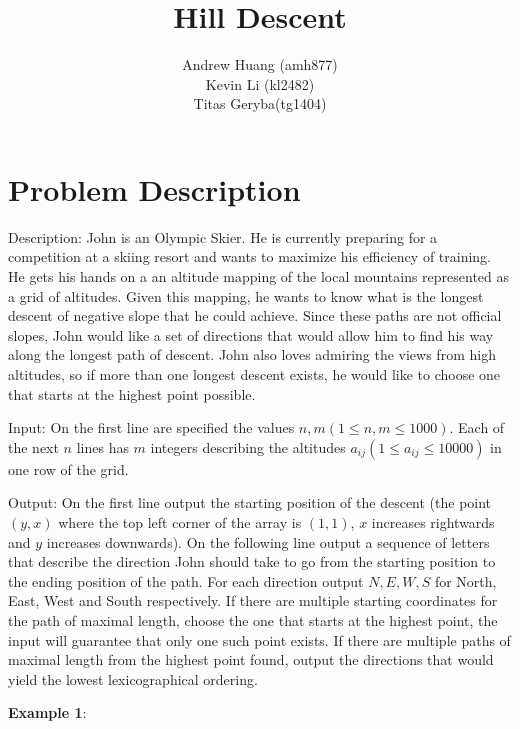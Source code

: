 \documentclass[a4paper,11pt]{article}
\title{Hill Descent}
\author{Andrew Huang (amh877) \\
Kevin Li (kl2482) \\
Titas Geryba(tg1404)}
\begin{document}
\maketitle

\section{Problem Description}

Description: John is an Olympic Skier. He is currently preparing for a competition at a skiing resort and wants to maximize his efficiency of training. He gets his hands on a an altitude mapping of the local mountains represented as a grid of altitudes. Given this mapping, he wants to know what is the longest descent of negative slope that he could achieve. Since these paths are not official slopes, John would like a set of directions that would allow him to find his way along the longest path of descent. John also loves admiring the views from high altitudes, so if more than one longest descent exists, he would like to choose one that starts at the highest point possible.

\vspace{3mm}

Input: On the first line are specified the values $n, m (1 \leq n, m \leq 1000)$. Each of the next $n$ lines has $m$ integers describing the altitudes $a_{ij} (1 \leq a_{ij} \leq 10000)$ in one row of the grid. 

\vspace{3mm}

Output: On the first line output the starting position of the descent (the point $(y, x)$ where the top left corner of the array is $(1, 1)$, $x$ increases rightwards and $y$ increases downwards). On the following line output a sequence of letters that describe the direction John should take to go from the starting position to the ending position of the path. For each direction output $N, E, W, S$ for North, East, West and South respectively. If there are multiple starting coordinates for the path of maximal length, choose the one that starts at the highest point, the input will guarantee that only one such point exists. If there are multiple paths of maximal length from the highest point found, output the directions that would yield the lowest lexicographical ordering. 


\newpage

\noindent \textbf{Example 1}:

\vspace{2mm}
\end{document}
